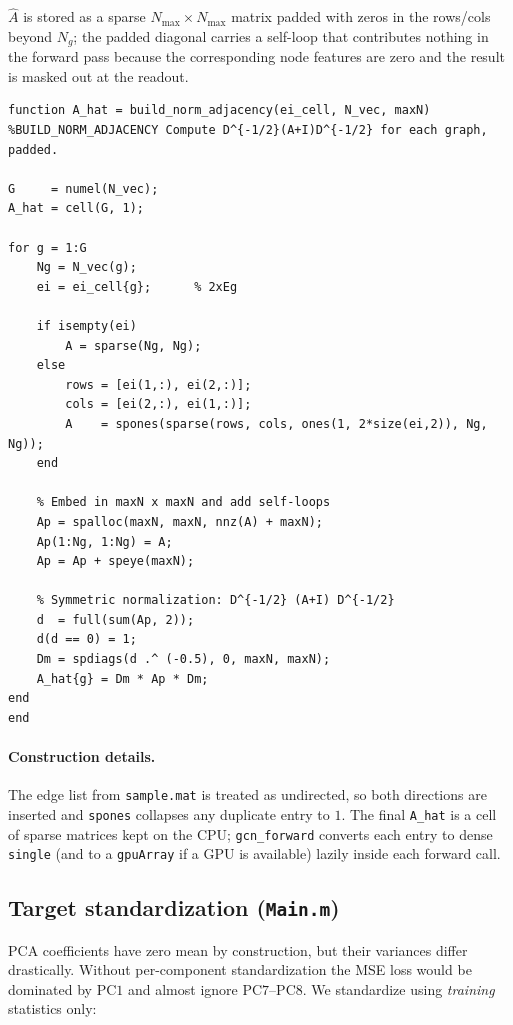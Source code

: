 \documentclass[11pt]{article}
\begin{document}
$\hat A$ is stored as a sparse $N_{\max}\times N_{\max}$ matrix padded with
zeros in the rows/cols beyond $N_g$; the padded diagonal carries a self-loop
that contributes nothing in the forward pass because the corresponding node
features are zero and the result is masked out at the readout.

\begin{lstlisting}[caption={\texttt{helpers/build\_norm\_adjacency.m}}]
function A_hat = build_norm_adjacency(ei_cell, N_vec, maxN)
%BUILD_NORM_ADJACENCY Compute D^{-1/2}(A+I)D^{-1/2} for each graph, padded.

G     = numel(N_vec);
A_hat = cell(G, 1);

for g = 1:G
    Ng = N_vec(g);
    ei = ei_cell{g};      % 2xEg

    if isempty(ei)
        A = sparse(Ng, Ng);
    else
        rows = [ei(1,:), ei(2,:)];
        cols = [ei(2,:), ei(1,:)];
        A    = spones(sparse(rows, cols, ones(1, 2*size(ei,2)), Ng, Ng));
    end

    % Embed in maxN x maxN and add self-loops
    Ap = spalloc(maxN, maxN, nnz(A) + maxN);
    Ap(1:Ng, 1:Ng) = A;
    Ap = Ap + speye(maxN);

    % Symmetric normalization: D^{-1/2} (A+I) D^{-1/2}
    d  = full(sum(Ap, 2));
    d(d == 0) = 1;
    Dm = spdiags(d .^ (-0.5), 0, maxN, maxN);
    A_hat{g} = Dm * Ap * Dm;
end
end
\end{lstlisting}

\paragraph{Construction details.}
The edge list from \texttt{sample.mat} is treated as undirected, so both
directions are inserted and \texttt{spones} collapses any duplicate entry to
$1$. The final \texttt{A\_hat} is a cell of sparse matrices kept on the CPU;
\texttt{gcn\_forward} converts each entry to dense \texttt{single} (and to a
\texttt{gpuArray} if a GPU is available) lazily inside each forward call.

\subsection{Target standardization (\texttt{Main.m})}

PCA coefficients have zero mean by construction, but their variances differ
drastically. Without per-component standardization the MSE loss would be
dominated by PC$1$ and almost ignore PC$7$--PC$8$. We standardize using
\emph{training} statistics only:
\end{document}
